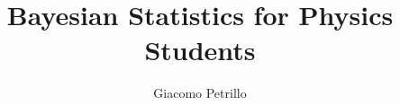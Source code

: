\documentclass[a4paper,fleqn]{book}
\title{Bayesian Statistics for Physics Students}
\author{Giacomo Petrillo}
\begin{document}
    
    \frontmatter

    \maketitle

    \tableofcontents
    
    

    \mainmatter

    
    
    
    
    
    
    \appendix

    \solutions
    
    \backmatter
\end{document}
